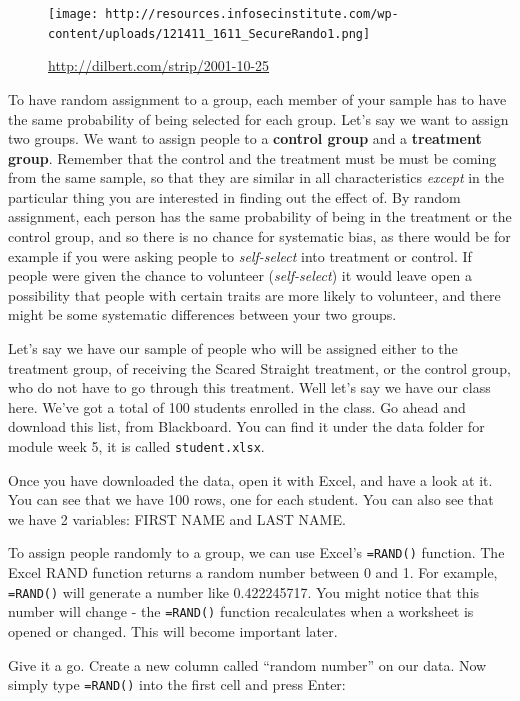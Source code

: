 \documentclass[
]{book}
\begin{document}
\begin{figure}
\centering
\texttt{[image: http://resources.infosecinstitute.com/wp-content/uploads/121411\_1611\_SecureRando1.png]}
\caption{\url{http://dilbert.com/strip/2001-10-25}}
\end{figure}

To have random assignment to a group, each member of your sample has to have the same probability of being selected for each group. Let's say we want to assign two groups. We want to assign people to a \textbf{control group} and a \textbf{treatment group}. Remember that the control and the treatment must be must be coming from the same sample, so that they are similar in all characteristics \emph{except} in the particular thing you are interested in finding out the effect of. By random assignment, each person has the same probability of being in the treatment or the control group, and so there is no chance for systematic bias, as there would be for example if you were asking people to \emph{self-select} into treatment or control. If people were given the chance to volunteer (\emph{self-select}) it would leave open a possibility that people with certain traits are more likely to volunteer, and there might be some systematic differences between your two groups.

Let's say we have our sample of people who will be assigned either to the treatment group, of receiving the Scared Straight treatment, or the control group, who do not have to go through this treatment. Well let's say we have our class here. We've got a total of 100 students enrolled in the class. Go ahead and download this list, from Blackboard. You can find it under the data folder for module week 5, it is called \texttt{student.xlsx}.

Once you have downloaded the data, open it with Excel, and have a look at it. You can see that we have 100 rows, one for each student. You can also see that we have 2 variables: FIRST NAME and LAST NAME.

To assign people randomly to a group, we can use Excel's \texttt{=RAND()} function. The Excel RAND function returns a random number between 0 and 1. For example, \texttt{=RAND()} will generate a number like 0.422245717. You might notice that this number will change - the \texttt{=RAND()} function recalculates when a worksheet is opened or changed. This will become important later.

Give it a go. Create a new column called ``random number'' on our data. Now simply type \texttt{=RAND()} into the first cell and press Enter:
\end{document}
